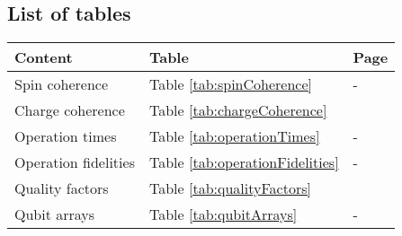 \documentclass[aps, prx, showpacs, twocolumn, superscriptaddress, notitlepage, longbibliography, floatfix, nofootinbib]{revtex4-2}
\newif\ifFirstTableOnly
\begin{document}
\begin{widetext}



\section{List of tables}

\label{app:tables}

\vspace{1cm}

\begin{table}[h!]
\Large
\begin{center}
\begin{tabular}{l@{\quad}ll}
\toprule
Content & Table & Page\\
\midrule
Spin coherence & Table \ref{tab:spinCoherence} & \pageref{spinCoherence1}-\pageref{spinCoherence4}\\
Charge coherence & Table \ref{tab:chargeCoherence} & \pageref{chargeCoherence}\\
Operation times & Table \ref{tab:operationTimes} & \pageref{operationTime1}-\pageref{operationTime2}\\
Operation fidelities & Table \ref{tab:operationFidelities} & \pageref{operationFidelity1}-\pageref{operationFidelity2}\\
Quality factors & Table \ref{tab:qualityFactors} & \pageref{qualityFactorMerged}\\
Qubit arrays & Table \ref{tab:qubitArrays} & \pageref{qubitArray1}-\pageref{qubitArray2}\\
\bottomrule
\end{tabular}
\end{center}
\end{table}

\vspace{1cm}





\addtocounter{table}{-1}\label{tab:spinCoherence}
\renewcommand\thetable{\Roman{table}-\arabic{subtable}}
\setcounter{subtable}{1}


\addtocounter{table}{-1}
\addtocounter{subtable}{+1}

\ifFirstTableOnly \else

\addtocounter{table}{-1}
\addtocounter{subtable}{+1}


\addtocounter{table}{-1}
\addtocounter{subtable}{+1}


\end{widetext}
\end{document}

